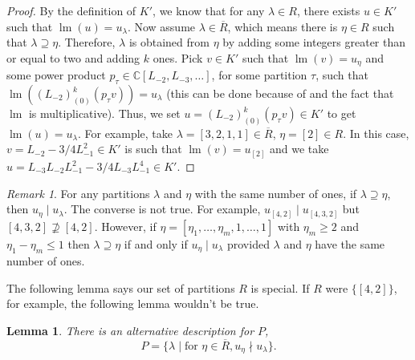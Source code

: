 \documentclass[a4paper, 12pt, reqno]{amsart}
\newtheorem{lemma}[theorem]{Lemma}
\theoremstyle{remark}
\newtheorem{remark}[theorem]{Remark}
\numberwithin{equation}{subsection}
\DeclareMathOperator{\lm}{lm}
\begin{document}
\begin{proof}
  By the definition of $K'$, we know that for any $\lambda \in R$, there exists $u \in K'$ such that $\lm(u) = u_{\lambda}$.
  Now assume $\lambda \in \overline{R}$, which means there is $\eta \in R$ such that $\lambda \supseteq \eta$.
  Therefore, $\lambda$ is obtained from $\eta$ by adding some integers greater than or equal to two and adding $k$ ones.
  Pick $v \in K'$ such that $\lm(v) = u_{\eta}$ and some power product $p_{\tau} \in \mathbb{C}[L_{-2}, L_{-3}, \dots]$, for some partition $\tau$, such that $\lm((L_{-2})^k_{(0)}(p_{\tau}v)) = u_{\lambda}$ (this can be done because of  and the fact that $\lm$ is multiplicative).
  Thus, we set $u = (L_{-2})^k_{(0)}(p_{\tau}v) \in K'$ to get $\lm(u) = u_{\lambda}$.
  For example, take $\lambda = [3, 2, 1, 1] \in \overline{R}$, $\eta = [2] \in R$.
  In this case, $v = L_{-2}- 3/4L_{-1}^2 \in K'$ is such that $\lm(v) = u_{[2]}$ and we take $u = L_{-3}L_{-2}L_{-1}^2 - 3/4L_{-3}L_{-1}^4 \in K'$.
\end{proof}

\begin{remark}
  \label{rmk:42}
  For any partitions $\lambda$ and $\eta$ with the same number of ones, if $\lambda \supseteq \eta$, then $u_{\eta} \mid u_{\lambda}$.
  The converse is not true.
  For example, $u_{[4, 2]} \mid u_{[4, 3, 2]}$ but $[4, 3, 2] \nsupseteq [4, 2]$.
  However, if $\eta = [\eta_1, \dots, \eta_m, 1, \dots, 1]$ with $\eta_m \ge 2$ and $\eta_1 - \eta_m \le 1$ then $\lambda \supseteq \eta$ if and only if $u_{\eta} \mid u_{\lambda}$ provided $\lambda$ and $\eta$ have the same number of ones.
\end{remark}

The following lemma says our set of partitions $R$ is special.
If $R$ were $\{[4, 2]\}$, for example, the following lemma wouldn't be true.

\begin{lemma}
  \label{lmm:30}
  There is an alternative description for $P$,
  \begin{equation*}
    P = \{\lambda \mid \text{for }\eta \in \overline{R}, u_{\eta} \nmid u_{\lambda}\}.
  \end{equation*}
\end{lemma}
\end{document}
